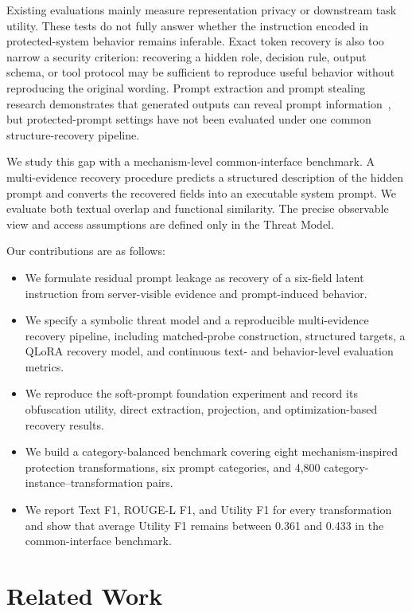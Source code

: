 \documentclass[letterpaper]{article} %
\begin{document}
Existing evaluations mainly measure representation privacy or downstream task utility.  These tests do not fully answer whether the instruction encoded in protected-system behavior remains inferable.  Exact token recovery is also too narrow a security criterion: recovering a hidden role, decision rule, output schema, or tool protocol may be sufficient to reproduce useful behavior without reproducing the original wording.  Prompt extraction and prompt stealing research demonstrates that generated outputs can reveal prompt information~\citep{zhang2024effective,sha2024promptstealing,hui2024pleak,deng2024promptleakage,das2025spe}, but protected-prompt settings have not been evaluated under one common structure-recovery pipeline.

We study this gap with a mechanism-level common-interface benchmark.  A multi-evidence recovery procedure predicts a structured description of the hidden prompt and converts the recovered fields into an executable system prompt.  We evaluate both textual overlap and functional similarity.  The precise observable view and access assumptions are defined only in the Threat Model.

Our contributions are as follows:
\begin{itemize}
    \item We formulate residual prompt leakage as recovery of a six-field latent instruction from server-visible evidence and prompt-induced behavior.
    \item We specify a symbolic threat model and a reproducible multi-evidence recovery pipeline, including matched-probe construction, structured targets, a QLoRA recovery model, and continuous text- and behavior-level evaluation metrics.
    \item We reproduce the soft-prompt foundation experiment and record its obfuscation utility, direct extraction, projection, and optimization-based recovery results.
    \item We build a category-balanced benchmark covering eight mechanism-inspired protection transformations, six prompt categories, and 4,800 category-instance--transformation pairs.
    \item We report Text F1, ROUGE-L F1, and Utility F1 for every transformation and show that average Utility F1 remains between 0.361 and 0.433 in the common-interface benchmark.
\end{itemize}

\section{Related Work}
\end{document}
